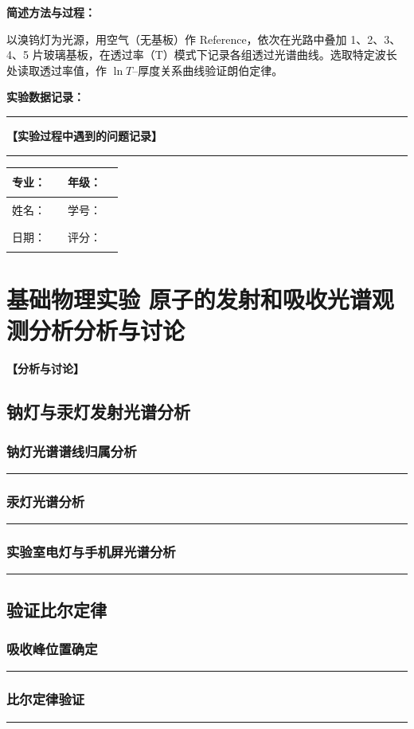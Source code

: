 \documentclass[dvipsnames, svgnames,a4paper,11pt]{article}
\newcommand{\recordblank}[1]{%
  \par\noindent\rule{0.95\linewidth}{0pt}\rule{0pt}{#1}\par}
\begin{document}
\textbf{简述方法与过程：}

以溴钨灯为光源，用空气（无基板）作 Reference，依次在光路中叠加 1、2、3、4、5 片玻璃基板，在透过率（T）模式下记录各组透过光谱曲线。选取特定波长处读取透过率值，作 $\ln T$--厚度关系曲线验证朗伯定律。

\textbf{实验数据记录：}
\recordblank{5.5cm}
\textbf{【实验过程中遇到的问题记录】}
\recordblank{5cm}
\clearpage
\begin{table}
	\renewcommand\arraystretch{1.7}
	\begin{tabularx}{\textwidth}{|X|X|X|X|}
	\hline
	专业：& \rule{2.5cm}{0.4pt} & 年级：& \rule{2.5cm}{0.4pt}\\
	\hline
	姓名：& \rule{2.5cm}{0.4pt} & 学号：& \rule{3cm}{0.4pt}\\
	\hline
	日期：& \rule{3cm}{0.4pt} & 评分：& \rule{3cm}{0.4pt}\\
	\hline
	\end{tabularx}
\end{table}

\section{基础物理实验  \quad 原子的发射和吸收光谱观测分析\heiti 分析与讨论}
\textbf{【分析与讨论】}
\subsection{钠灯与汞灯发射光谱分析}
\subsubsection{钠灯光谱谱线归属分析}
\recordblank{3.2cm}
\subsubsection{汞灯光谱分析}
\recordblank{3.2cm}
\subsubsection{实验室电灯与手机屏光谱分析}
\recordblank{3.2cm}
\subsection{验证比尔定律}
\subsubsection{吸收峰位置确定}
\recordblank{3.2cm}
\subsubsection{比尔定律验证}
\recordblank{3.2cm}
\end{document}
